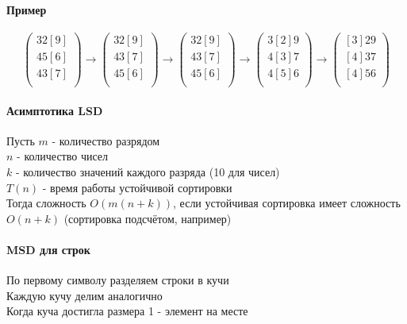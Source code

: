 \documentclass[a4paper,10pt]{article}
\begin{document}
	\paragraph{Пример}
	\[
		\begin{pmatrix}
			32[9] \\
			45[6] \\
			43[7] \\
		\end{pmatrix}
		\rightarrow
		\begin{pmatrix}
			32[9] \\
			43[7] \\
			45[6] \\
		\end{pmatrix}
		\rightarrow
		\begin{pmatrix}
			32[9] \\
			43[7] \\
			45[6] \\
		\end{pmatrix}
		\rightarrow
		\begin{pmatrix}
			3[2]9 \\
			4[3]7 \\
			4[5]6 \\
		\end{pmatrix}
		\rightarrow
		\begin{pmatrix}
			[3]29 \\
			[4]37 \\
			[4]56 \\
		\end{pmatrix}
	\]	
	\paragraph{Асимптотика LSD}
	Пусть $m$ - количество разрядом \\
	$n$ - количество чисел \\
	$k$ - количество значений каждого разряда (10 для чисел) \\
	$T(n)$ - время работы устойчивой сортировки \\
	Тогда сложность $O(m(n+k))$, если устойчивая сортировка имеет сложность $O(n+k)$ (сортировка подсчётом, например)
	\paragraph{MSD для строк}
	По первому символу разделяем строки в кучи \\
	Каждую кучу делим аналогично \\
	Когда куча достигла размера 1 - элемент на месте
\end{document}
